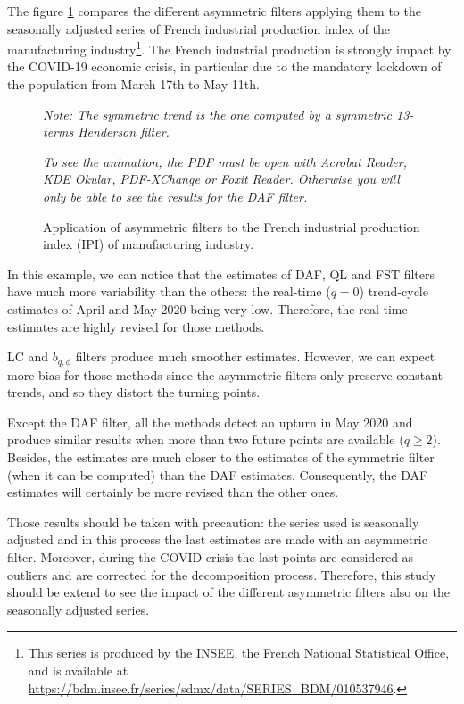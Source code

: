 \documentclass[
  12pt,
  ,
  a4paper]{article}
\begin{document}
The figure \ref{fig:cl2all} compares the different asymmetric filters applying them to the seasonally adjusted series of French industrial production index of the manufacturing industry\footnote{This series is produced by the INSEE, the French National Statistical Office, and is available at \url{https://bdm.insee.fr/series/sdmx/data/SERIES_BDM/010537946}.}.
The French industrial production is strongly impact by the COVID-19 economic crisis, in particular due to the mandatory lockdown of the population from March 17th to May 11th.

\begin{figure}[!ht]
\caption{Application of asymmetric filters to the French industrial production index (IPI) of manufacturing industry.}\label{fig:cl2all}\footnotesize
\emph{Note: The symmetric trend is the one computed by a symmetric 13-terms Henderson filter.}

\emph{To see the animation, the PDF must be open with Acrobat Reader, KDE Okular, PDF-XChange or Foxit Reader.
Otherwise you will only be able to see the results for the DAF filter.}
\end{figure}

In this example, we can notice that the estimates of DAF, QL and FST filters have much more variability than the others: the real-time (\(q=0\)) trend-cycle estimates of April and May 2020 being very low.
Therefore, the real-time estimates are highly revised for those methods.

LC and \(b_{q,\phi}\) filters produce much smoother estimates.
However, we can expect more bias for those methods since the asymmetric filters only preserve constant trends, and so they distort the turning points.

Except the DAF filter, all the methods detect an upturn in May 2020 and produce similar results when more than two future points are available (\(q\geq 2\)).
Besides, the estimates are much closer to the estimates of the symmetric filter (when it can be computed) than the DAF estimates.
Consequently, the DAF estimates will certainly be more revised than the other ones.

Those results should be taken with precaution: the series used is seasonally adjusted and in this process the last estimates are made with an asymmetric filter.
Moreover, during the COVID crisis the last points are considered as outliers and are corrected for the decomposition process.
Therefore, this study should be extend to see the impact of the different asymmetric filters also on the seasonally adjusted series.
\end{document}
